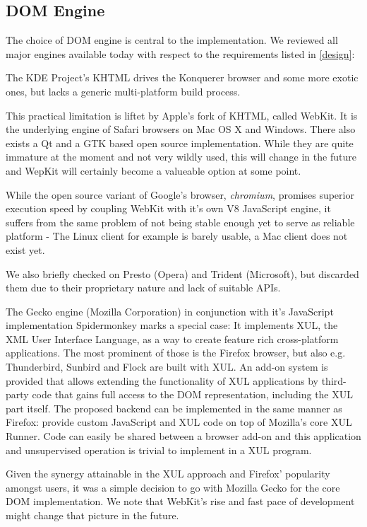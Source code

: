 \subsection{DOM Engine}

The choice of DOM engine is central to the implementation.
We reviewed all major engines available today with respect to the requirements listed in \ref{design}:

The KDE Project's KHTML drives the Konquerer browser and some more exotic ones, but lacks a generic multi-platform build process.

This practical limitation is liftet by Apple's fork of KHTML, called WebKit.
It is the underlying engine of Safari browsers on Mac OS X and Windows. %
There also exists a Qt and a GTK based open source implementation.
While they are quite immature at the moment and not very wildly used, this will change in the future and WepKit will certainly become a valueable option at some point.

While the open source variant of Google's browser, \textit{chromium}, promises superior execution speed by coupling WebKit with it's own V8 JavaScript engine, it suffers from the same problem of not being stable enough yet to serve as reliable platform -
The Linux client for example is barely usable, a Mac client does not exist yet.

We also briefly checked on Presto (Opera) and Trident (Microsoft), but discarded them due to their proprietary nature and lack of suitable APIs.

The Gecko engine (Mozilla Corporation) in conjunction with it's JavaScript implementation Spidermonkey marks a special case:
It implements XUL, the XML User Interface Language, as a way to create feature rich cross-platform applications.
The most prominent of those is the Firefox browser, but also e.g. Thunderbird, Sunbird and Flock are built with XUL.
An add-on system is provided that allows extending the functionality of XUL applications by third-party code that gains full access to the DOM representation, including the XUL part itself.
The proposed {\KrdWrd} backend can be implemented in the same manner as Firefox: provide custom JavaScript and XUL code on top of Mozilla's core XUL Runner. 
Code can easily be shared between a browser add-on and this application and unsupervised operation is trivial to implement in a XUL program.

Given the synergy attainable in the XUL approach and Firefox' popularity amongst users, it was a simple decision to go with Mozilla Gecko for the core DOM implementation.
We note that WebKit's rise and fast pace of development might change that picture in the future.

